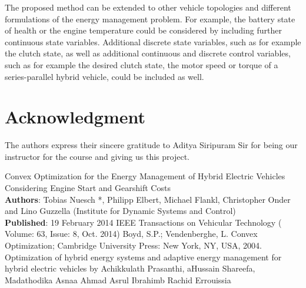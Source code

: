 \documentclass[conference]{IEEEtran}
\begin{document}
The proposed method can be extended to other vehicle topologies and different formulations of the energy management problem. For example, the battery state of health or the engine temperature could be considered by including further continuous state variables. Additional discrete state variables, such
as for example the clutch state, as well as additional continuous and discrete control variables, such as for example the desired clutch state, the motor speed or torque of a series-parallel hybrid vehicle, could be included as well.


\section*{Acknowledgment}
The authors express their sincere gratitude to Aditya Siripuram Sir for being our instructor for the course and giving us this project.
\begin{thebibliography}{00}
 Convex Optimization for the Energy Management of Hybrid Electric Vehicles Considering Engine Start and Gearshift Costs \\ \textbf{Authors}: Tobias Nuesch *, Philipp Elbert, Michael Flankl, Christopher Onder and Lino
Guzzella (Institute for Dynamic Systems and Control) \\
\textbf{Published}: 19 February 2014
 IEEE Transactions on Vehicular Technology ( Volume: 63, Issue: 8, Oct. 2014)
 Boyd, S.P.; Vendenberghe, L. Convex Optimization; Cambridge University Press: New York, NY, USA, 2004.
 Optimization of hybrid energy systems and adaptive energy management for hybrid electric vehicles by Achikkulath Prasanthi,  aHussain Shareefa, Madathodika Asnaa Ahmad Asrul Ibrahimb Rachid Errouissia

\end{thebibliography}
\end{document}
